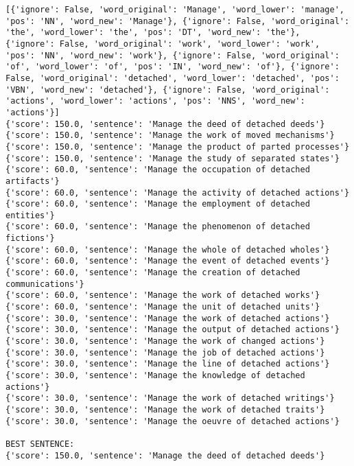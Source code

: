 \documentclass[12pt,a4paper,oneside]{book}
\begin{document}
\begin{verbatim}
[{'ignore': False, 'word_original': 'Manage', 'word_lower': 'manage', 'pos': 'NN', 'word_new': 'Manage'}, {'ignore': False, 'word_original': 'the', 'word_lower': 'the', 'pos': 'DT', 'word_new': 'the'}, {'ignore': False, 'word_original': 'work', 'word_lower': 'work', 'pos': 'NN', 'word_new': 'work'}, {'ignore': False, 'word_original': 'of', 'word_lower': 'of', 'pos': 'IN', 'word_new': 'of'}, {'ignore': False, 'word_original': 'detached', 'word_lower': 'detached', 'pos': 'VBN', 'word_new': 'detached'}, {'ignore': False, 'word_original': 'actions', 'word_lower': 'actions', 'pos': 'NNS', 'word_new': 'actions'}]
{'score': 150.0, 'sentence': 'Manage the deed of detached deeds'}
{'score': 150.0, 'sentence': 'Manage the work of moved mechanisms'}
{'score': 150.0, 'sentence': 'Manage the product of parted processes'}
{'score': 150.0, 'sentence': 'Manage the study of separated states'}
{'score': 60.0, 'sentence': 'Manage the occupation of detached artifacts'}
{'score': 60.0, 'sentence': 'Manage the activity of detached actions'}
{'score': 60.0, 'sentence': 'Manage the employment of detached entities'}
{'score': 60.0, 'sentence': 'Manage the phenomenon of detached fictions'}
{'score': 60.0, 'sentence': 'Manage the whole of detached wholes'}
{'score': 60.0, 'sentence': 'Manage the event of detached events'}
{'score': 60.0, 'sentence': 'Manage the creation of detached communications'}
{'score': 60.0, 'sentence': 'Manage the work of detached works'}
{'score': 60.0, 'sentence': 'Manage the unit of detached units'}
{'score': 30.0, 'sentence': 'Manage the work of detached actions'}
{'score': 30.0, 'sentence': 'Manage the output of detached actions'}
{'score': 30.0, 'sentence': 'Manage the work of changed actions'}
{'score': 30.0, 'sentence': 'Manage the job of detached actions'}
{'score': 30.0, 'sentence': 'Manage the line of detached actions'}
{'score': 30.0, 'sentence': 'Manage the knowledge of detached actions'}
{'score': 30.0, 'sentence': 'Manage the work of detached writings'}
{'score': 30.0, 'sentence': 'Manage the work of detached traits'}
{'score': 30.0, 'sentence': 'Manage the oeuvre of detached actions'}

BEST SENTENCE:
{'score': 150.0, 'sentence': 'Manage the deed of detached deeds'}



\end{verbatim}
\end{document}
